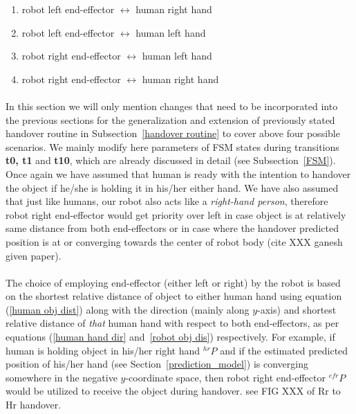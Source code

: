 \documentclass[a4paper, 12pt, oneside]{Thesis}  %
\begin{document}
\begin{enumerate}
	\item robot left end-effector $\longleftrightarrow$ human right hand
	\item robot left end-effector $\longleftrightarrow$ human left hand
	\item robot right end-effector $\longleftrightarrow$ human left hand
	\item robot right end-effector $\longleftrightarrow$ human right hand
\end{enumerate}

\paragraph*{}
In this section we will only mention changes that need to be incorporated into the previous sections for the generalization and extension of previously stated handover routine in Subsection~\ref{handover routine} to cover above four possible scenarios. We mainly modify here parameters of FSM states during transitions {\bf t0, t1} and {\bf t10}, which are already discussed in detail (see Subsection~\ref{FSM}). Once again we have assumed that human is ready with the intention to handover the object if he/she is holding it in his/her either hand. We have also assumed that just like humans, our robot also acts like a \textit{right-hand person}, therefore robot right end-effector would get priority over left in case object is at relatively same distance from both end-effectors or in case where the handover predicted position is at or converging towards the center of robot body (cite XXX ganesh given paper). 

\paragraph*{}
The choice of employing end-effector (either left or right) by the robot is based on the shortest relative distance of object to either human hand using equation (\ref{human obj dist}) along with the direction (mainly along $y$-axis) and shortest relative distance of \textit{that} human hand with respect to both end-effectors, as per equations (\ref{human hand dir} and~\ref{robot obj dis}) respectively. For example, if human is holding object in his/her right hand ${}^{hr}{P}$ and if the estimated predicted position of his/her hand (see Section~\ref{prediction_model}) is converging somewhere in the negative $y$-coordinate space, then robot right end-effector ${}^{efr}{P}$ would be utilized to receive the object during handover. see FIG XXX of Rr to Hr handover.
\end{document}
